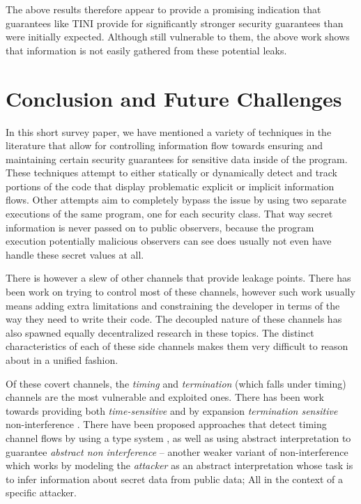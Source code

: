 \documentclass[preprint]{sigplanconf}
\begin{document}
The above results therefore appear to provide a promising indication that guarantees like TINI provide for significantly stronger security guarantees than were initially expected. Although still vulnerable to them, the above work shows that information is not easily gathered from these potential leaks.

\section{Conclusion and Future Challenges}
\label{sec:5}

In this short survey paper, we have mentioned a variety of techniques in the literature that allow for controlling information flow towards ensuring and maintaining certain security guarantees for sensitive data inside of the program. These techniques attempt to either statically or dynamically detect and track portions of the code that  display problematic explicit or implicit information flows. Other attempts aim to completely bypass the issue by using two separate executions of the same program, one for each security class. That way secret information is never passed on to public observers, because the program execution potentially malicious observers can see does usually not even have handle these secret values at all.

There is however a slew of other channels that provide leakage points.
There has been work on trying to control most of these channels, however such work usually means adding extra limitations and constraining the developer in terms of the way they need to write their code. The decoupled nature of these channels has also spawned equally decentralized research in these topics. The distinct characteristics of each of these side channels makes them very difficult to reason about in a unified fashion.

Of these covert channels, the \textit{timing} and \textit{termination} (which falls under  timing) channels are the most vulnerable and exploited ones. There has been work towards providing both \textit{time-sensitive} and by expansion \textit{termination sensitive} non-interference \cite{barthe2006preventing,kashyap2011timing}. There have been proposed approaches that detect timing channel flows by using a type system \cite{agat2000transforming}, as well as using abstract interpretation to guarantee \textit{abstract non interference} \cite{giacobazzi2004abstract, giacobazzi2005timed} -- another weaker variant of non-interference which works by modeling the \textit{attacker} as an abstract interpretation whose task is to infer information about secret data from public data; All in the context of a specific attacker.
\end{document}
